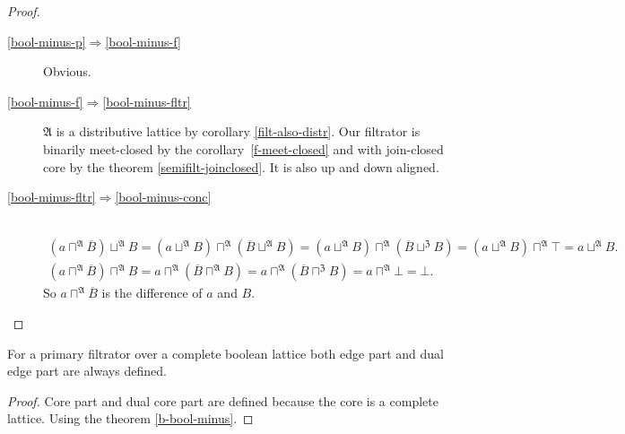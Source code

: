 \begin{proof}
~
\begin{description}
\item [{\ref{bool-minus-p}$\Rightarrow$\ref{bool-minus-f}}] Obvious.
\item [{\ref{bool-minus-f}$\Rightarrow$\ref{bool-minus-fltr}}] $\mathfrak{A}$
is a distributive lattice by corollary \ref{filt-also-distr}. Our
filtrator is binarily meet-closed by the corollary~\ref{f-meet-closed}
and with join-closed core by the theorem \ref{semifilt-joinclosed}.
It is also up and down aligned.
\item [{\ref{bool-minus-fltr}$\Rightarrow$\ref{bool-minus-conc}}] ~
\begin{gather*}
(a\sqcap^{\mathfrak{A}}\overline{B})\sqcup^{\mathfrak{A}}B=(a\sqcup^{\mathfrak{A}}B)\sqcap^{\mathfrak{A}}(\overline{B}\sqcup^{\mathfrak{A}}B)=(a\sqcup^{\mathfrak{A}}B)\sqcap^{\mathfrak{A}}(\overline{B}\sqcup^{\mathfrak{Z}}B)=(a\sqcup^{\mathfrak{A}}B)\sqcap^{\mathfrak{A}}\top=a\sqcup^{\mathfrak{A}}B.\\
(a\sqcap^{\mathfrak{A}}\overline{B})\sqcap^{\mathfrak{A}}B=a\sqcap^{\mathfrak{A}}(\overline{B}\sqcap^{\mathfrak{A}}B)=a\sqcap^{\mathfrak{A}}(\overline{B}\sqcap^{\mathfrak{Z}}B)=a\sqcap^{\mathfrak{A}}\bot=\bot.
\end{gather*}
So $a\sqcap^{\mathfrak{A}}\overline{B}$ is the difference of $a$
and $B$.
\end{description}
\end{proof}

\begin{prop}
For a primary filtrator over a complete boolean lattice both edge
part and dual edge part are always defined.\end{prop}
\begin{proof}
Core part and dual core part are defined because the core is a complete
lattice. Using the theorem \ref{b-bool-minus}.\end{proof}

